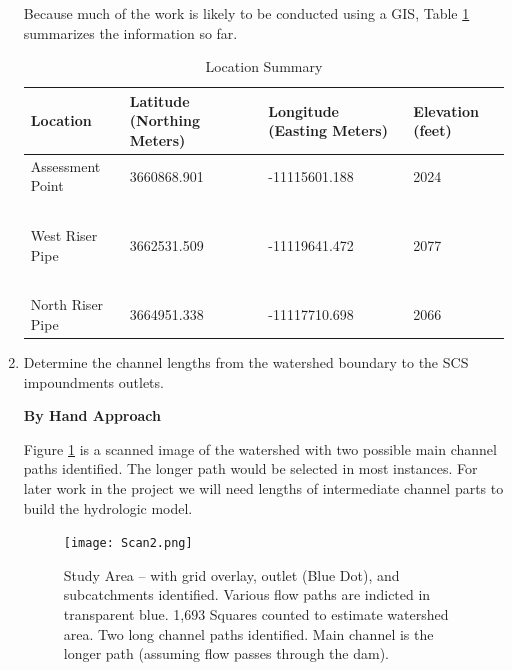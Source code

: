 \documentclass[12pt]{article}
\begin{document}
\begin{enumerate}
\clearpage

Because much of the work is likely to be conducted using a GIS, Table \ref{tab:SummaryLocations} summarizes the information so far.

\begin{table}[htbp]
   \centering
   \caption{Location Summary}
   \begin{tabular}{p{1.5in}p{1.5in}p{1.5in}p{1in}} %
Location & Latitude (Northing Meters) & Longitude (Easting Meters) & Elevation (feet) \\
\hline
\hline
Assessment Point& 3660868.901 & -11115601.188 & 2024 \\
~ & ~ & ~ & ~ \\
West Riser Pipe & 3662531.509 & -11119641.472 & 2077 \\
~ & ~ & ~ & ~ \\
North Riser Pipe & 3664951.338 & -11117710.698 & 2066  \\
\hline
\end{tabular}
\label{tab:SummaryLocations}
\end{table}

\clearpage


\item Determine the channel lengths from the watershed boundary to the SCS impoundments outlets.  

\textbf{By Hand Approach}

Figure \ref{fig:ES2-WatershedArea-3} is a scanned image of the watershed with two possible main channel paths identified.  The longer path would be selected in most instances.  For later work in the project we will need lengths of intermediate channel parts to build the hydrologic model.

\begin{figure}[h!] %
   \centering
   \texttt{[image: Scan2.png]} 
   \caption{Study Area -- with grid overlay, outlet (Blue Dot), and subcatchments identified.  Various flow paths are indicted in transparent blue.  1,693 Squares counted to estimate watershed area.  Two long channel paths identified.  Main channel is the longer path (assuming flow passes through the dam).}
   \label{fig:ES2-WatershedArea-3}
\end{figure}


\end{enumerate}
\end{document}
